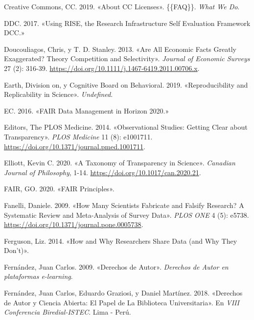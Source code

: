 \documentclass[
  spanish,
  letterpaper,
  DIV=11,
  numbers=noendperiod]{scrreprt}
\newlength{\cslhangindent}
\newenvironment{CSLReferences}[2] %
 {\begin{list}{}{%
  \setlength{\itemindent}{0pt}
  \setlength{\leftmargin}{0pt}
  \setlength{\parsep}{0pt}
  \ifodd #1
   \setlength{\leftmargin}{\cslhangindent}
   \setlength{\itemindent}{-1\cslhangindent}
  \fi
  \setlength{\itemsep}{#2\baselineskip}}}
 {\end{list}}
\begin{document}
\begin{CSLReferences}{1}{0}
Creative Commons, CC. 2019. {«About {CC Licenses}»}. \{\{FAQ\}\}.
\emph{What We Do}.

DDC. 2017. {«Using {RISE}, the {Research Infrastructure Self Evaluation
Framework} {\textbar} {DCC}.»}

Doucouliagos, Chris, y T. D. Stanley. 2013. {«Are {All Economic Facts
Greatly Exaggerated}? {Theory Competition} and {Selectivity}»}.
\emph{Journal of Economic Surveys} 27 (2): 316-39.
\url{https://doi.org/10.1111/j.1467-6419.2011.00706.x}.

Earth, Division on, y Cognitive Board on Behavioral. 2019.
{«Reproducibility and {Replicability} in {Science}»}. \emph{Undefined}.

EC. 2016. {«{FAIR Data Management} in {Horizon} 2020.»}

Editors, The PLOS Medicine. 2014. {«Observational {Studies}: {Getting
Clear} about {Transparency}»}. \emph{PLOS Medicine} 11 (8): e1001711.
\url{https://doi.org/10.1371/journal.pmed.1001711}.

Elliott, Kevin C. 2020. {«A {Taxonomy} of {Transparency} in {Science}»}.
\emph{Canadian Journal of Philosophy}, 1-14.
\url{https://doi.org/10.1017/can.2020.21}.

FAIR, GO. 2020. {«{FAIR Principles}»}.

Fanelli, Daniele. 2009. {«How {Many Scientists Fabricate} and {Falsify
Research}? {A Systematic Review} and {Meta-Analysis} of {Survey Data}»}.
\emph{PLOS ONE} 4 (5): e5738.
\url{https://doi.org/10.1371/journal.pone.0005738}.

Ferguson, Liz. 2014. {«How and {Why Researchers Share Data} (and {Why
They Don}'t)»}.

Fernández, Juan Carlos. 2009. {«Derechos de {Autor}»}. \emph{Derechos de
Autor en plataformas e-learning}.

Fernández, Juan Carlos, Eduardo Graziosi, y Daniel Martínez. 2018.
{«Derechos de Autor y Ciencia Abierta: El Papel de La Biblioteca
Universitaria»}. En \emph{{VIII Conferencia Biredial-ISTEC}}. Lima -
Per{ú}.


\end{CSLReferences}
\end{document}
